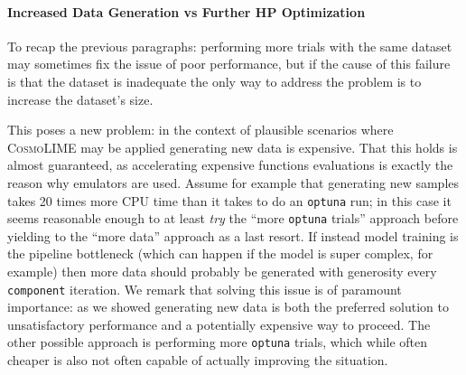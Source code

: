 \paragraph{Increased Data Generation vs Further HP Optimization}
To recap the previous paragraphs: performing more trials with the same dataset may sometimes fix the issue of poor performance, but if the cause of this failure is that the dataset is inadequate the only way to address the problem is to increase the dataset's size.

This poses a new problem: in the context of plausible scenarios where \textsc{CosmoLIME} may be applied generating new data is expensive. That this holds is almost guaranteed, as accelerating expensive functions evaluations is exactly the reason why emulators are used. Assume for example that generating new samples takes 20 times more CPU time than it takes to do an \texttt{optuna} run; in this case it seems reasonable enough to at least \emph{try} the ``more \texttt{optuna} trials'' approach before yielding to the ``more data'' approach as a last resort. If instead model training is the pipeline bottleneck (which can happen if the model is super complex, for example) then more data should probably be generated with generosity every \texttt{component} iteration.
We remark that solving this issue is of paramount importance: as we showed generating new data is both the preferred solution to unsatisfactory performance and a potentially expensive way to proceed. The other possible approach is performing more \texttt{optuna} trials, which while often cheaper is also not often capable of actually improving the situation.

